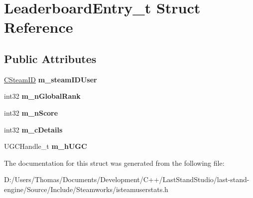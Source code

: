 \hypertarget{structLeaderboardEntry__t}{}\section{Leaderboard\+Entry\+\_\+t Struct Reference}
\label{structLeaderboardEntry__t}
\subsection*{Public Attributes}
\begin{DoxyCompactItemize}
\item 
\hypertarget{structLeaderboardEntry__t_a031fe87b9806d39a3fc1b3b5dd5ef014}{}\hyperlink{classCSteamID}{C\+Steam\+I\+D} {\bfseries m\+\_\+steam\+I\+D\+User}\label{structLeaderboardEntry__t_a031fe87b9806d39a3fc1b3b5dd5ef014}

\item 
\hypertarget{structLeaderboardEntry__t_af7f941b570f44f907dc1cee5cae888ea}{}int32 {\bfseries m\+\_\+n\+Global\+Rank}\label{structLeaderboardEntry__t_af7f941b570f44f907dc1cee5cae888ea}

\item 
\hypertarget{structLeaderboardEntry__t_a6032254adc05d810cfe7b3c214fdafea}{}int32 {\bfseries m\+\_\+n\+Score}\label{structLeaderboardEntry__t_a6032254adc05d810cfe7b3c214fdafea}

\item 
\hypertarget{structLeaderboardEntry__t_adf2c9fa2d9bed13e9bdf86f36f5730d8}{}int32 {\bfseries m\+\_\+c\+Details}\label{structLeaderboardEntry__t_adf2c9fa2d9bed13e9bdf86f36f5730d8}

\item 
\hypertarget{structLeaderboardEntry__t_ab11176f3288ff721245ede6e49877947}{}U\+G\+C\+Handle\+\_\+t {\bfseries m\+\_\+h\+U\+G\+C}\label{structLeaderboardEntry__t_ab11176f3288ff721245ede6e49877947}

\end{DoxyCompactItemize}


The documentation for this struct was generated from the following file\+:\begin{DoxyCompactItemize}
\item 
D\+:/\+Users/\+Thomas/\+Documents/\+Development/\+C++/\+Last\+Stand\+Studio/last-\/stand-\/engine/\+Source/\+Include/\+Steamworks/isteamuserstats.\+h\end{DoxyCompactItemize}
